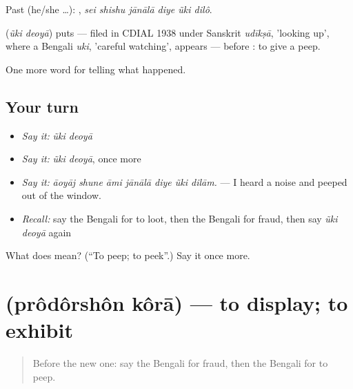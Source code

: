 Past (he/she …):      , \emph{sei shishu jānālā diye ũki dilô}.

\begin{cousinweb}
\textbf{ } (\emph{ũki deoyā}) puts  — filed in CDIAL 1938 under Sanskrit \emph{udīkṣā}, 'looking up', where a Bengali \emph{uki}, 'careful watching', appears — before : to give a peep.
\end{cousinweb}

\begin{grammarlens}[title={What you've built}]
One more word for telling what happened.
\end{grammarlens}

\subsection*{Your turn}
\begin{itemize}
\raggedright
  \item \emph{Say it:} \emph{ũki deoyā}
  \item \emph{Say it:} \emph{ũki deoyā}, once more
  \item \emph{Say it:} \emph{āoyāj shune āmi jānālā diye ũki dilām.} — I heard a noise and peeped out of the window.
  \item \emph{Recall:} say the Bengali for to loot, then the Bengali for fraud, then say \emph{ũki deoyā} again
\end{itemize}

\begin{tcolorbox}[breakable,colback=teal!4,colframe=teal!35!black,title={Before you move on}]
What does   mean? (\textquotedblleft{}To peep; to peek\textquotedblright{}.) Say it once more.
\end{tcolorbox}
\section[\texorpdfstring{\bn{প্রদর্শন} \bn{করা} (prôdôrshôn kôrā)}{প্রদর্শন করা (prôdôrshôn kôrā)}]{  (prôdôrshôn kôrā) — to display; to exhibit}

\label{lesson:BN-C286-prodorshon-kora}



\begin{quote}
Before the new one: say the Bengali for fraud, then the Bengali for to peep.
\end{quote}

